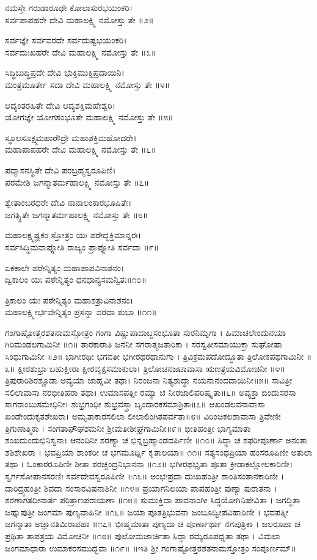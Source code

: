	ನಮಸ್ತೇ ಗರುಡಾರೂಢೇ ಕೋಲಾಸುರಭಯಂಕರಿ।\\
	ಸರ್ವಪಾಪಹರೇ ದೇವಿ ಮಹಾಲಕ್ಷ್ಮಿ ನಮೋಸ್ತು ತೇ ॥೨॥

ಸರ್ವಜ್ಞೇ ಸರ್ವವರದೇ ಸರ್ವದುಷ್ಟಭಯಂಕರಿ।\\
ಸರ್ವದುಃಖಹರೇ ದೇವಿ ಮಹಾಲಕ್ಷ್ಮಿ ನಮೋಸ್ತು ತೇ ॥೩॥

	ಸಿದ್ಧಿಬುದ್ಧಿಪ್ರದೇ ದೇವಿ ಭುಕ್ತಿಮುಕ್ತಿಪ್ರದಾಯಿನಿ।\\
	ಮಂತ್ರಮೂರ್ತೇ ಸದಾ ದೇವಿ ಮಹಾಲಕ್ಷ್ಮಿ ನಮೋಸ್ತು ತೇ ॥೪॥

ಆದ್ಯಂತರಹಿತೇ ದೇವಿ ಆದ್ಯಶಕ್ತಿಮಹೇಶ್ವರಿ।\\
ಯೋಗಜ್ಞೇ ಯೋಗಸಂಭೂತೇ ಮಹಾಲಕ್ಷ್ಮಿ ನಮೋಸ್ತು ತೇ ॥೫॥

	ಸ್ಥೂಲಸೂಕ್ಷ್ಮಮಹಾರೌದ್ರೇ ಮಹಾಶಕ್ತಿಮಹೋದರೇ।\\
	ಮಹಾಪಾಪಹರೇ ದೇವಿ ಮಹಾಲಕ್ಷ್ಮಿ ನಮೋಸ್ತು ತೇ ॥೬॥

ಪದ್ಮಾಸನಸ್ಥಿತೇ ದೇವಿ ಪರಬ್ರಹ್ಮಸ್ವರೂಪಿಣಿ।\\
ಪರಮೇಶಿ ಜಗನ್ಮಾತರ್ಮಹಾಲಕ್ಷ್ಮಿ ನಮೋಸ್ತು ತೇ ॥೭॥

	ಶ್ವೇತಾಂಬರಧರೇ ದೇವಿ ನಾನಾಲಂಕಾರಭೂಷಿತೇ।\\
	ಜಗತ್ಸ್ಥಿತೇ ಜಗನ್ಮಾತರ್ಮಹಾಲಕ್ಷ್ಮಿ ನಮೋಸ್ತು ತೇ ॥೮॥

ಮಹಾಲಕ್ಷ್ಮ್ಯಷ್ಟಕಂ ಸ್ತೋತ್ರಂ ಯಃ ಪಠೇದ್ಭಕ್ತಿಮಾನ್ನರಃ।\\
ಸರ್ವಸಿದ್ಧಿಮವಾಪ್ನೋತಿ ರಾಜ್ಯಂ ಪ್ರಾಪ್ನೋತಿ ಸರ್ವದಾ ॥೯॥

	ಏಕಕಾಲೇ ಪಠೇನ್ನಿತ್ಯಂ ಮಹಾಪಾಪವಿನಾಶನಂ।\\
	ದ್ವಿಕಾಲಂ ಯಃ ಪಠೇನ್ನಿತ್ಯಂ ಧನಧಾನ್ಯಸಮನ್ವಿತಃ॥೧೦॥

ತ್ರಿಕಾಲಂ ಯಃ ಪಠೇನ್ನಿತ್ಯಂ ಮಹಾಶತ್ರುವಿನಾಶನಂ।\\
ಮಹಾಲಕ್ಷ್ಮೀರ್ಭವೇನ್ನಿತ್ಯಂ ಪ್ರಸನ್ನಾ ವರದಾ ಶುಭಾ ॥೧೧॥


ಗಂಗಾಷ್ಟೋತ್ತರಶತನಾಮಸ್ತೋತ್ರಂ
ಗಂಗಾ ವಿಷ್ಣುಪಾದಾಬ್ಜಸಂಭೂತಾ ಸುರನಿಮ್ನಗಾ ।
ಹಿಮಾಚಲೇಂದುನಯಾ ಗಿರಿಮಂಡಲಗಾಮಿನೀ ॥೧॥
	ತಾರಕಾರಾತಿ ಜನನೀ ಸಗರಾತ್ಮಜತಾರಿಕಾ ।
	ಸರಸ್ವತೀಸಮಾಯುಕ್ತಾ ಸುಘೋಷಾ ಸಿಂಧುಗಾಮಿನೀ ॥೨॥
ಭಾಗೀರಥೀ ಭಗವತೀ ಭಗೀರಥರಥಾನುಗಾ ।
ತ್ರಿವಿಕ್ರಮಪದೋದ್ಭೂತಾ ತ್ರಿಲೋಕಪಥಗಾಮಿನೀ ॥೩॥
	ಕ್ಷೀರಶುಭ್ರಾ ಬಹುಕ್ಷೀರಾ ಕ್ಷೀರವೃಕ್ಷಸಮಾಕುಲಾ।
	ತ್ರಿಲೋಚನಜಟಾವಾಸಾ ಋಣತ್ರಯವಿಮೋಚಿನೀ ॥೪॥
ತ್ರಿಪುರಾರಿಶಿರಶ್ಚೂಡಾ ಅವ್ಯಯಾ ಜಾಹ್ನವೀ ತಥಾ।
ನಿರಂಜನಾ ನಿತ್ಯಶುದ್ಧಾ ನಯನಾನಂದದಾಯಿನೀ॥೫॥
	ಸಾವಿತ್ರೀ ಸಲಿಲಾವಾಸಾ ನರಭೀತಿಹರಾ ತಥಾ।
	ಉಮಾಸಪತ್ನೀ ರಮ್ಯಾ ಚ ನೀರಜಾಲಿಪರಿಷ್ಕೃತಾ॥೬॥
ಅವ್ಯಕ್ತಾ ಬಿಂದುಸರಸಾ ಸಾಗರಾಂಬುಸಮೇಧಿನೀ।
ಶುಭ್ರಗಂಧೀ ಶುಭ್ರವಸ್ತ್ರಾ ಬೃಂದಾರಕಸಮಾಶ್ರಿತಾ॥೭॥
	ಆಖಂಡಲವನಾವಾಸಾ ಖಂಡೇಂದುಕೃತಶೇಖರಾ।
	ಅಮೃತಾಕಾರಸಲಿಲಾ ಲೀಲಾಲಿಂಗಿತಪರ್ವತಾ॥೮॥
ವಿರಿಂಚಿಕಲಶಾವಾಸಾ ತ್ರಿವೇಣೀ ತ್ರಿಗುಣಾತ್ಮಿಕಾ ।
ಸಂಗತಾಘೌಘಶಮನೀ ಶ್ರೀಮತೀಶೀಘ್ರಗಾಮಿನೀ॥೯॥
	ಭೀತಿಹಂತ್ರೀ ಭಾಗ್ಯಮಾತಾ ಶಂಖದುಂದುಭಿನಿಸ್ವನಾ।
	ಆನಂದಿನೀ ಶರಣ್ಯಾ ಚ ಭಿನ್ನಬ್ರಹ್ಮಾಂಡದರ್ಪಿಣೀ ॥೧೦॥
ಸಿದ್ಧಾ ಚ ಶಫರೀಪೂರ್ಣಾ ಅನಂತಾ ಶಶಿಶೇಖರಾ ।
ಭವಪ್ರಿಯಾ ಶಾಂಕರೀ ಚ ಭಗಮೂರ್ಧ್ನಿ ಕೃತಾಲಯಾ॥ ೧೧॥
	ಸತ್ಯಸಂಧಪ್ರಿಯಾ ಹಂಸರೂಪಿಣೀ ಅತುಲಾ ತಥಾ ।
	ಓಂಕಾರರೂಪಿಣೀ ಶೀತಾ ಶರಚ್ಚಂದ್ರನಿಭಾನನಾ ॥೧೨॥
ಭಗೀರಥಭೃತಾ ಪೂತಾ ಕ್ರೀಡಾಕಲ್ಲೋಲಕಾರಿಣೀ।
ಸ್ವರ್ಗಸೋಪಾನಸರಣಿಃ ಸರ್ವದೇವಸ್ವರೂಪಿಣೀ ॥೧೩॥
	ಅಂಭಃಪ್ರದಾ ದುಃಖಹಂತ್ರೀ ಶಾಂತಿಸಂತಾನಕಾರಿಣೀ ।
	ದಾರಿದ್ರ್ಯಹಂತ್ರೀ ಶಿವದಾ ಸಂಸಾರವಿಷನಾಶಿನೀ ॥೧೪॥
ಪ್ರಯಾಗನಿಲಯಾ ಪಾಪಹಂತ್ರೀ ಪುಣ್ಯಾ ಪುರಾತನಾ ।
ಶರಣಾಗತದೀನಾರ್ತ ಪರಿತ್ರಾಣಪರಾಯಣಾ ॥೧೫॥
	ಸುಮುಕ್ತಿದಾ ಪಾವನಾಂಗೀ ಸಿದ್ಧಯೋಗಿನಿಷೇವಿತಾ ।
	ಜಗದ್ಧಿತಾ ಜಹ್ನುಪುತ್ರೀ ಜಂಗಮಾ ಪುಣ್ಯವಾಹಿನೀ ॥೧೬॥
ಜಯಾ ಪೂತತ್ರಿಭುವನಾ ಜಂಬೂದ್ವೀಪವಿಹಾರಿಣೀ ।
ಭವಪತ್ನೀ ಜಗನ್ಮಾತಾ ಅಜ್ಞಾನತಿಮಿರಾಪಹಾ ॥೧೭॥
	ಭೀಷ್ಮಮಾತಾ ಪುಣ್ಯದಾ ಚ ಪೂರ್ಣಾರ್ಥಾ ನಗಪುತ್ರಿಕಾ ।
	ಜಲರೂಪಾ ಚ ಪ್ರಥಿತಾ ತಾಪತ್ರಯ ವಿಮೋಚಿನೀ ॥೧೮॥
ಪುಲೋಮಜಾರ್ಚಿತಾ ಸಿದ್ಧಾ ರಮ್ಯರೂಪಧೃತಾ ತಥಾ ।
ವಿಮಲಾ ಜಂಗಮಾಧಾರಾ ಉಮಾಕರಸಮುದ್ಭವಾ ॥೧೯॥
॥ಇತಿ ಶ್ರೀ ಗಂಗಾಷ್ಟೋತ್ತರಶತನಾಮಸ್ತೋತ್ರಂ ಸಂಪೂರ್ಣಮ್॥
